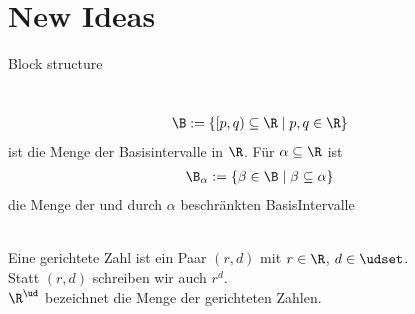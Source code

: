 \chapter{New Ideas}

Block structure

\begin{nota}\ \\
    \begin{align*}
      \B := \{[p,q) \subseteq \R \mid p,q \in \R\}
    \end{align*}
    ist die Menge der Basisintervalle in $\R$.
    Für $\alpha \subseteq \R$ ist
    \begin{align*}
        \B_{\alpha} := \{ \beta \in \B \mid \beta \subseteq \alpha\}
    \end{align*}
    die Menge der und durch $\alpha$ beschränkten BasisIntervalle
\end{nota}

\begin{bsp}
 \begin{align*}
  [-5.78,14\pi) &\in \B\\
  [6,4) &\notin \B\\
  [1,1) &\notin \B\\
  [-5.78,14\pi) &\in \B_{[-10,100]}\\
  [-5.78,14\pi) &\notin \B_{[0,1]}
 \end{align*}
\end{bsp}




\begin{dfn}\ \\
    Eine gerichtete Zahl ist ein Paar $(r,d)$ mit $r \in \R$, $d \in \udset$.\\
    Statt $(r,d)$ schreiben wir auch $r^d$.\\
    $\R^\ud$ bezeichnet die Menge der gerichteten Zahlen.
\end{dfn}


